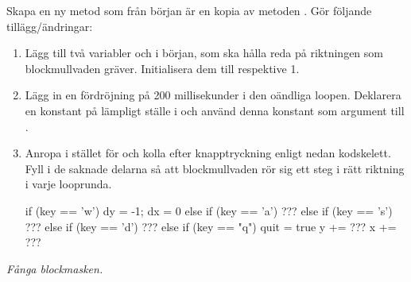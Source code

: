 \Subtask
Skapa en ny metod  som från början är en kopia av metoden . Gör följande tillägg/ändringar:
\begin{enumerate}

\item Lägg till två variabler  och  i början, som ska hålla reda på riktningen som blockmullvaden gräver. Initialisera dem till  respektive {1}.

\item Lägg in en fördröjning på 200 millisekunder i den oändliga loopen. Deklarera en konstant  på lämpligt ställe i  och använd denna konstant som argument till .

\item Anropa  i stället för  och kolla efter knapptryckning enligt nedan kodskelett. Fyll i de saknade delarna så att blockmullvaden rör sig ett steg i rätt riktning i varje looprunda.
\begin{Code}
      if      (key == 'w') { dy = -1; dx = 0 }
      else if (key == 'a') { ??? }
      else if (key == 's') { ??? }
      else if (key == 'd') { ??? }
      else if (key == "q") { quit = true }
      y += ???
      x += ???
\end{Code}


%

\end{enumerate}

\Task\label{lab:blockmole:task:blockworm} \emph{Fånga blockmasken.}


